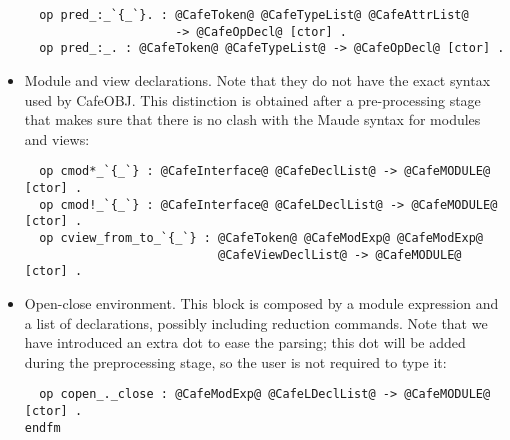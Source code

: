 \begin{itemize}
{\codesize
\begin{verbatim}
  op pred_:_`{_`}. : @CafeToken@ @CafeTypeList@ @CafeAttrList@
                     -> @CafeOpDecl@ [ctor] .
  op pred_:_. : @CafeToken@ @CafeTypeList@ -> @CafeOpDecl@ [ctor] .
\end{verbatim}
}

{\codesize
\begin{comment}
  ***observer declaration
  op bop_:_->_. : @CafeToken@ @CafeTypeList@ @CafeSort@  -> @CafeOpDecl@ [ctor] .
  op bops_:_->_. : @NeCafeTokenList@ @CafeTypeList@ @CafeSort@ -> @CafeOpDecl@ [ctor] .
  op bop_:_->_`{_`}. : @CafeToken@ @CafeTypeList@ @CafeSort@ @CafeAttrList@
                       -> @CafeOpDecl@ [ctor] .
  op bops_:_->_`{_`}. : @NeCafeTokenList@ @CafeTypeList@ @CafeType@ @CafeAttrList@
                        -> @CafeOpDecl@ [ctor] .
  op bceq_=_if_. : @CafeBubble@ @CafeBubble@ @CafeBubble@ ->
                   @BehaviorEquationDecl@ [ctor] .
  op bcq_=_if_. : @CafeBubble@ @CafeBubble@ @CafeBubble@ ->
                  @BehaviorEquationDecl@ [ctor] .

  *** View declarations
  op vvar_:_. : @NeCafeTokenList@ @CafeType@ -> @CafeViewDecl@ [ctor] .
  op vvars_:_. : @NeCafeTokenList@ @CafeType@ -> @CafeViewDecl@ [ctor] .
  op sort_->_. : @CafeToken@ @CafeToken@ -> @CafeViewDecl@ [ctor] .
  op hsort_->_. : @CafeToken@ @CafeToken@ -> @CafeViewDecl@ [ctor] .
  op op_->_. : @CafeBubble@ @CafeBubble@ -> @CafeViewDecl@ [ctor] .
  op bop_->_. : @CafeBubble@ @CafeBubble@ -> @CafeViewDecl@ [ctor] .

  *** Reduction declarations
  op reduce_. : @CafeBubble@ -> @ReductionDecl@ [ctor] .
\end{comment}
}

\item
Module and view declarations. Note that they do not have the exact syntax used
by CafeOBJ. This distinction is obtained after a pre-processing stage that makes sure
that there is no clash with the Maude syntax for modules and views:

{\codesize
\begin{verbatim}
  op cmod*_`{_`} : @CafeInterface@ @CafeDeclList@ -> @CafeMODULE@ [ctor] .
  op cmod!_`{_`} : @CafeInterface@ @CafeLDeclList@ -> @CafeMODULE@ [ctor] .
  op cview_from_to_`{_`} : @CafeToken@ @CafeModExp@ @CafeModExp@
                           @CafeViewDeclList@ -> @CafeMODULE@ [ctor] .
\end{verbatim}
}

\item
Open-close environment. This block is composed by a module expression and a list of
declarations, possibly including reduction commands. Note that we have introduced an
extra dot to ease the parsing; this dot will be added during the preprocessing stage,
so the user is not required to type it:

{\codesize
\begin{verbatim}
  op copen_._close : @CafeModExp@ @CafeLDeclList@ -> @CafeMODULE@ [ctor] .
endfm
\end{verbatim}
}

\end{itemize}

